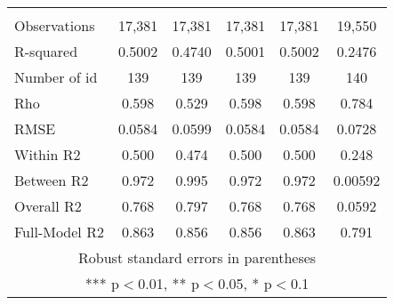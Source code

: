 \documentclass[]{article}
\begin{document}
\begin{tabular}{lccccc}
 &  &  &  &  &  \\
Observations & 17,381 & 17,381 & 17,381 & 17,381 & 19,550 \\
R-squared & 0.5002 & 0.4740 & 0.5001 & 0.5002 & 0.2476 \\
Number of id & 139 & 139 & 139 & 139 & 140 \\
Rho & 0.598 & 0.529 & 0.598 & 0.598 & 0.784 \\
RMSE & 0.0584 & 0.0599 & 0.0584 & 0.0584 & 0.0728 \\
Within R2 & 0.500 & 0.474 & 0.500 & 0.500 & 0.248 \\
Between R2 & 0.972 & 0.995 & 0.972 & 0.972 & 0.00592 \\
Overall R2 & 0.768 & 0.797 & 0.768 & 0.768 & 0.0592 \\
 Full-Model R2 & 0.863 & 0.856 & 0.856 & 0.863 & 0.791 \\ \hline
\multicolumn{6}{c}{ Robust standard errors in parentheses} \\
\multicolumn{6}{c}{ *** p$<$0.01, ** p$<$0.05, * p$<$0.1} \\
\end{tabular}
\end{document}
